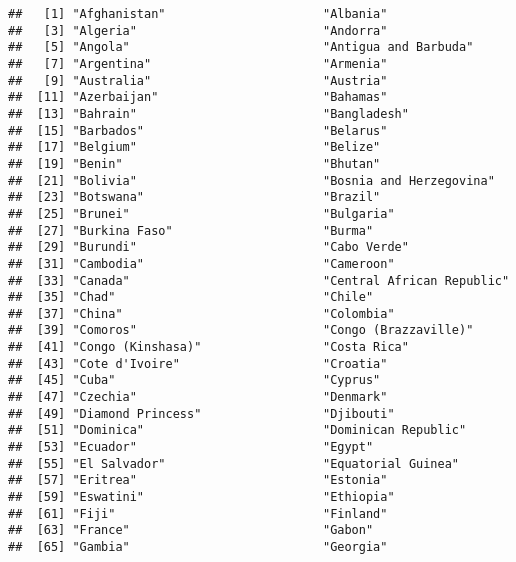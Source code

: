 \documentclass[]{tufte-handout}
\begin{document}
\begin{verbatim}
##   [1] "Afghanistan"                      "Albania"                         
##   [3] "Algeria"                          "Andorra"                         
##   [5] "Angola"                           "Antigua and Barbuda"             
##   [7] "Argentina"                        "Armenia"                         
##   [9] "Australia"                        "Austria"                         
##  [11] "Azerbaijan"                       "Bahamas"                         
##  [13] "Bahrain"                          "Bangladesh"                      
##  [15] "Barbados"                         "Belarus"                         
##  [17] "Belgium"                          "Belize"                          
##  [19] "Benin"                            "Bhutan"                          
##  [21] "Bolivia"                          "Bosnia and Herzegovina"          
##  [23] "Botswana"                         "Brazil"                          
##  [25] "Brunei"                           "Bulgaria"                        
##  [27] "Burkina Faso"                     "Burma"                           
##  [29] "Burundi"                          "Cabo Verde"                      
##  [31] "Cambodia"                         "Cameroon"                        
##  [33] "Canada"                           "Central African Republic"        
##  [35] "Chad"                             "Chile"                           
##  [37] "China"                            "Colombia"                        
##  [39] "Comoros"                          "Congo (Brazzaville)"             
##  [41] "Congo (Kinshasa)"                 "Costa Rica"                      
##  [43] "Cote d'Ivoire"                    "Croatia"                         
##  [45] "Cuba"                             "Cyprus"                          
##  [47] "Czechia"                          "Denmark"                         
##  [49] "Diamond Princess"                 "Djibouti"                        
##  [51] "Dominica"                         "Dominican Republic"              
##  [53] "Ecuador"                          "Egypt"                           
##  [55] "El Salvador"                      "Equatorial Guinea"               
##  [57] "Eritrea"                          "Estonia"                         
##  [59] "Eswatini"                         "Ethiopia"                        
##  [61] "Fiji"                             "Finland"                         
##  [63] "France"                           "Gabon"                           
##  [65] "Gambia"                           "Georgia"                         

\end{verbatim}
\end{document}
